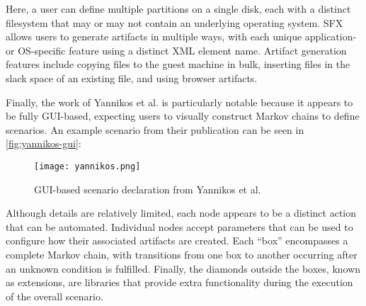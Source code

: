 Here, a user can define multiple partitions on a single disk, each with
a distinct filesystem that may or may not contain an underlying
operating system. SFX allows users to generate artifacts in multiple
ways, with each unique application- or OS-specific feature using a
distinct XML element name. Artifact generation features include copying
files to the guest machine in bulk, inserting files in the slack space
of an existing file, and using browser artifacts.

Finally, the work of Yannikos et al.
\cite{yannikosDataCorporaDigital2014} is particularly notable
because it appears to be fully GUI-based, expecting users to visually
construct Markov chains to define scenarios. An example scenario from
their publication can be seen in \autoref{fig:yannikos-gui}:

\begin{figure}[htbp]
\centering
\texttt{[image: yannikos.png]}
\caption{GUI-based scenario declaration from Yannikos et al.
\cite{yannikosDataCorporaDigital2014}}\label{fig:yannikos-gui}
\end{figure}

Although details are relatively limited, each node appears to be a
distinct action that can be automated. Individual nodes accept
parameters that can be used to configure how their associated artifacts
are created. Each ``box'' encompasses a complete Markov chain, with
transitions from one box to another occurring after an unknown condition
is fulfilled. Finally, the diamonds outside the boxes, known as
extensions, are libraries that provide extra functionality during the
execution of the overall scenario.
